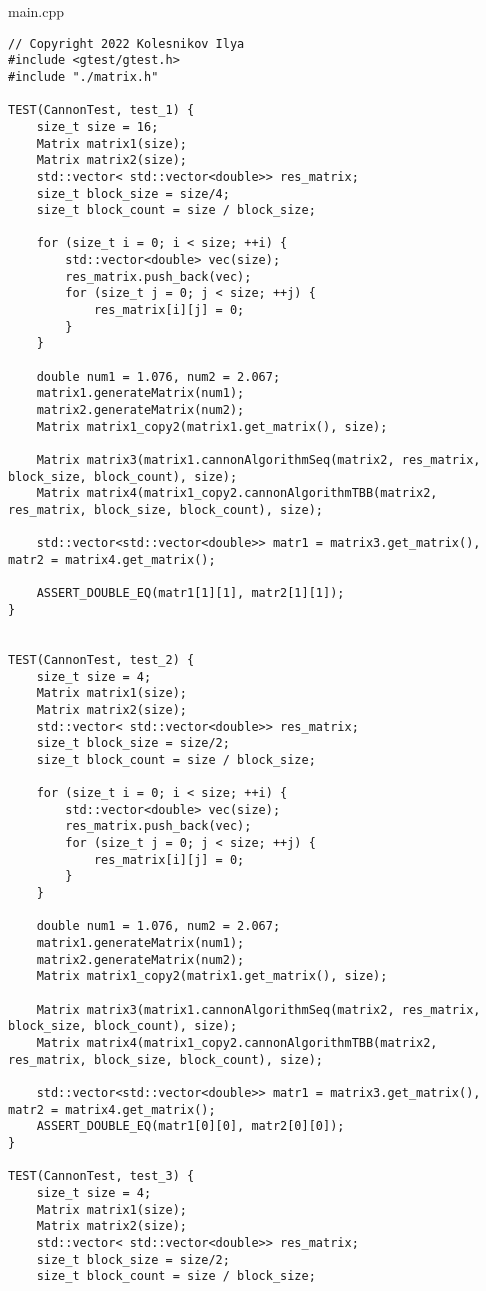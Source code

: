 \documentclass{report}
\begin{document}
main.cpp
\begin{lstlisting}
// Copyright 2022 Kolesnikov Ilya
#include <gtest/gtest.h>
#include "./matrix.h"

TEST(CannonTest, test_1) {
    size_t size = 16;
    Matrix matrix1(size);
    Matrix matrix2(size);
    std::vector< std::vector<double>> res_matrix;
    size_t block_size = size/4;
    size_t block_count = size / block_size;

    for (size_t i = 0; i < size; ++i) {
        std::vector<double> vec(size);
        res_matrix.push_back(vec);
        for (size_t j = 0; j < size; ++j) {
            res_matrix[i][j] = 0;
        }
    }

    double num1 = 1.076, num2 = 2.067;
    matrix1.generateMatrix(num1);
    matrix2.generateMatrix(num2);
    Matrix matrix1_copy2(matrix1.get_matrix(), size);

    Matrix matrix3(matrix1.cannonAlgorithmSeq(matrix2, res_matrix, block_size, block_count), size);
    Matrix matrix4(matrix1_copy2.cannonAlgorithmTBB(matrix2, res_matrix, block_size, block_count), size);

    std::vector<std::vector<double>> matr1 = matrix3.get_matrix(), matr2 = matrix4.get_matrix();

    ASSERT_DOUBLE_EQ(matr1[1][1], matr2[1][1]);
}


TEST(CannonTest, test_2) {
    size_t size = 4;
    Matrix matrix1(size);
    Matrix matrix2(size);
    std::vector< std::vector<double>> res_matrix;
    size_t block_size = size/2;
    size_t block_count = size / block_size;

    for (size_t i = 0; i < size; ++i) {
        std::vector<double> vec(size);
        res_matrix.push_back(vec);
        for (size_t j = 0; j < size; ++j) {
            res_matrix[i][j] = 0;
        }
    }

    double num1 = 1.076, num2 = 2.067;
    matrix1.generateMatrix(num1);
    matrix2.generateMatrix(num2);
    Matrix matrix1_copy2(matrix1.get_matrix(), size);

    Matrix matrix3(matrix1.cannonAlgorithmSeq(matrix2, res_matrix, block_size, block_count), size);
    Matrix matrix4(matrix1_copy2.cannonAlgorithmTBB(matrix2, res_matrix, block_size, block_count), size);

    std::vector<std::vector<double>> matr1 = matrix3.get_matrix(), matr2 = matrix4.get_matrix();
    ASSERT_DOUBLE_EQ(matr1[0][0], matr2[0][0]);
}

TEST(CannonTest, test_3) {
    size_t size = 4;
    Matrix matrix1(size);
    Matrix matrix2(size);
    std::vector< std::vector<double>> res_matrix;
    size_t block_size = size/2;
    size_t block_count = size / block_size;


\end{lstlisting}
\end{document}
